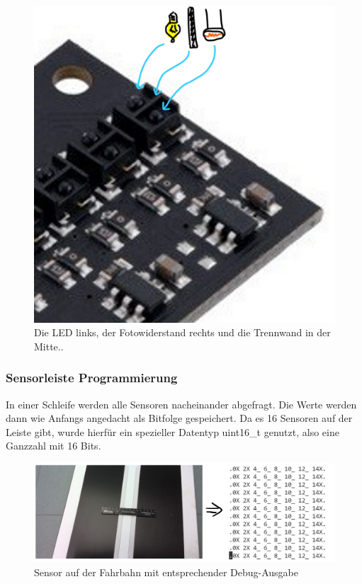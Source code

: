 	  \begin{figure}[H]
	  	\centering
	  	\label{sensor6}
	  	\includegraphics[scale=0.5]{img/Sensor/Sensor6.png}
	  	\caption{Die LED links, der Fotowiderstand rechts und die Trennwand in der Mitte..}
	  \end{figure}
	  
	\subsubsection{Sensorleiste Programmierung}
	
	In einer Schleife werden alle Sensoren nacheinander abgefragt. Die Werte werden dann wie Anfangs angedacht als Bitfolge gespeichert. Da es 16 Sensoren auf der Leiste gibt, wurde hierfür ein spezieller Datentyp uint16\_t genutzt, also eine Ganzzahl mit 16 Bits.
	\\
	
	\begin{figure}[H]
		\centering
		\label{sensor7}
		\includegraphics[scale=0.5]{img/Sensor/Sensor7.png}
		\caption{Sensor auf der Fahrbahn mit entsprechender Debug-Ausgabe}
	\end{figure}

